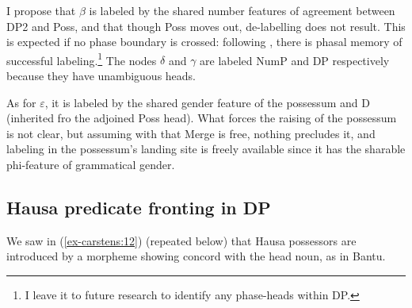 \documentclass[output=paper
,modfonts
,nonflat]{langsci/langscibook}
\begin{document}
\begin{figure}[!h]
	\begin{exe}
	\end{exe} \vspace{-0.7cm}
\end{figure}
\noindent I propose that $\beta$ is labeled by the shared number features of agreement between DP2 and Poss, and that though Poss moves out, de-labelling does not result. This is expected if no phase boundary is crossed: following \citet[11]{Chomsky2015}, there is phasal memory of successful labeling.\footnote{I leave it to future research to identify any phase-heads within DP.}  The nodes $\delta$ and $\gamma$ are labeled NumP and DP respectively because they have unambiguous heads. 

As for $\varepsilon$, it is labeled by the shared gender feature of the possessum and D (inherited fro the adjoined Poss head). What forces the raising of the possessum is not clear, but assuming with \citet{Chomsky2015} that Merge is free, nothing precludes it, and labeling in the possessum’s landing site is freely available since it has the sharable phi-feature of grammatical gender. 

\subsection{Hausa predicate fronting in DP} \label{sec-carstens:6.3}
We saw in (\ref{ex-carstens:12}) (repeated below) that Hausa possessors are introduced by a morpheme showing concord with the head noun, as in Bantu. 
\end{document}
